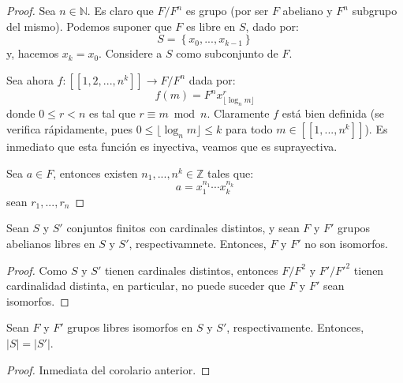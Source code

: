 \documentclass[12pt]{report}
\newcounter{it}
\theoremstyle{largebreak}
\newcommand\abs[1]{\ensuremath{\left|#1\right|}}
\newcommand\cf[3]{\ensuremath{#1:#2\rightarrow#3}}
\newcommand\natint[1]{\ensuremath{\left[\!\left[ #1\right]\!\right]}}
\begin{document}
    \begin{proof}        
        Sea $n\in\mathbb{N}$. Es claro que $F/F^n$ es grupo (por ser $F$ abeliano y $F^n$ subgrupo del mismo). Podemos suponer que $F$ es libre en $S$, dado por:
        \begin{equation*}
            S=\left\{x_0,...,x_{ k-1} \right\}
        \end{equation*}
        y, hacemos $x_k=x_0$. Considere a $S$ como subconjunto de $F$. 
        
        
        Sea ahora $\cf{f}{\natint{1,2,...,n^k}}{F/F^n}$ dada por:
        \begin{equation*}
            f(m)=F^nx_{\lfloor\log_n m \rfloor}^{r}
        \end{equation*}
        donde $0\leq r<n$ es tal que $r\equiv m\bmod n$. Claramente $f$ está bien definida (se verifica rápidamente, pues $0\leq\lfloor\log_nm\rfloor\leq k$ para todo $m\in\natint{1,...,n^k}$). Es inmediato que esta función es inyectiva, veamos que es suprayectiva.

        Sea $a\in F$, entonces existen $n_1,...,n^k\in\mathbb{Z}$ tales que:
        \begin{equation*}
            a=x_1^{ n_1}\cdots x_k^{ n_k}
        \end{equation*}
        sean $r_1,...,r_n$
    \end{proof}

    \begin{cor}
        Sean $S$ y $S'$ conjuntos finitos con cardinales distintos, y sean $F$ y $F'$ grupos abelianos libres en $S$ y $S'$, respectivamnete. Entonces, $F$ y $F'$ no son isomorfos.
    \end{cor}

    \begin{proof}
        Como $S$ y $S'$ tienen cardinales distintos, entonces $F/F^2$ y $F'/F'^{ 2}$ tienen cardinalidad distinta, en particular, no puede suceder que $F$ y $F'$ sean isomorfos.
    \end{proof}

    \begin{cor}
        Sean $F$ y $F'$ grupos libres isomorfos en $S$ y $S'$, respectivamente. Entonces, $\abs{S}=\abs{S'}$.
    \end{cor}

    \begin{proof}
        Inmediata del corolario anterior.
    \end{proof}
\end{document}
